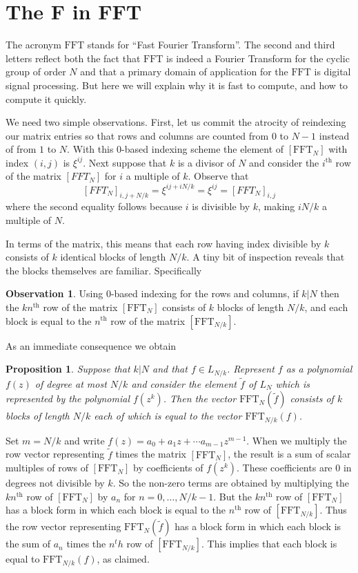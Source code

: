 \documentclass[12pt, letterpaper, oneside]{amsart}
\theoremstyle{definition}
\newtheorem{observation}[para]{Observation}
\theoremstyle{plain}
\newtheorem{proposition}[para]{Proposition}
\numberwithin{equation}{para}
\numberwithin{figure}{section}
\newcommand{\FFT}{\text{FFT}}
\renewcommand{\th}{\text{th}}
\begin{document}
\section{The F in FFT}

The acronym $\FFT$ stands for ``Fast Fourier Transform''.  The second and
third letters reflect both the fact that $\FFT$ is indeed a Fourier Transform
for the cyclic group of order $N$ and that a primary domain of application
for the $\FFT$ is digital signal processing.  But here we will explain why
it is fast to compute, and how to compute it quickly.

We need two simple observations.  First, let us commit the atrocity of
reindexing our matrix entries so that rows and columns are counted
from $0$ to $N-1$ instead of from $1$ to $N$.  With this $0$-based
indexing scheme the element of $[\FFT_N]$ with index $(i,j)$ is
$\xi^{ij}$.  Next suppose that $k$ is a divisor of $N$ and consider
the $i^\th$ row of the matrix $[FFT_N]$ for $i$ a multiple of $k$.
Observe that
$$[FFT_N]_{i,j+N/k} = \xi^{ij + iN/k} = \xi^{ij} = [FFT_N]_{i,j}$$
where the second equality follows because $i$ is divisible by $k$, making
$iN/k$ a multiple of $N$.

In terms of the matrix, this means that each row having index divisible
by $k$ consists of $k$ identical blocks of length $N/k$.  A tiny bit of
inspection reveals that the blocks themselves are familiar.  Specifically

\begin{observation}\label{observation:block}
Using $0$-based indexing for the rows and columns, if $k|N$ then the
$kn^\th$ row of the matrix $[\FFT_N]$ consists of $k$ blocks of length
$N/k$, and each block is equal to the $n^\th$ row of the matrix
$[\FFT_{N/k}]$.
\end{observation}

As an immediate consequence we obtain 
\begin{proposition}
Suppose that $k|N$ and that $f\in L_{N/k}$.  Represent $f$ as a
polynomial $f(z)$ of degree at most $N/k$ and consider the element
$\widetilde f$ of $L_N$ which is represented by the polynomial
$f(z^k)$.  Then the vector $\FFT_N(\widetilde f)$ consists of $k$
blocks of length $N/k$ each of which is equal to the vector
$\FFT_{N/k}(f)$.
\end{proposition}
\proof Set $m = N/k$ and write
$f(z) = a_0 + a_1z + \cdots a_{m-1}z^{m-1}$.  When we multiply the row
vector representing $\widetilde f$ times the matrix $[\FFT_N]$, the
result is a sum of scalar multiples of rows of $[\FFT_N]$ by
coefficients of $f(z^k)$.  These coefficients are $0$ in degrees not
divisible by $k$.  So the non-zero terms are obtained by multiplying
the $kn^\th$ row of $[\FFT_N]$ by $a_n$ for $n=0, \ldots, N/k-1$.  But
the $kn^\th$ row of $[\FFT_N]$ has a block form in which each block is
equal to the $n^\th$ row of $[\FFT_{N/k}]$.  Thus the row vector
representing $\FFT_N(\widetilde f)$ has a block form in which each
block is the sum of $a_n$ times the $n^th$ row of $[\FFT_{N/k}]$.
This implies that each block is equal to $\FFT_{N/k}(f)$, as claimed.
\endproof
\end{document}
